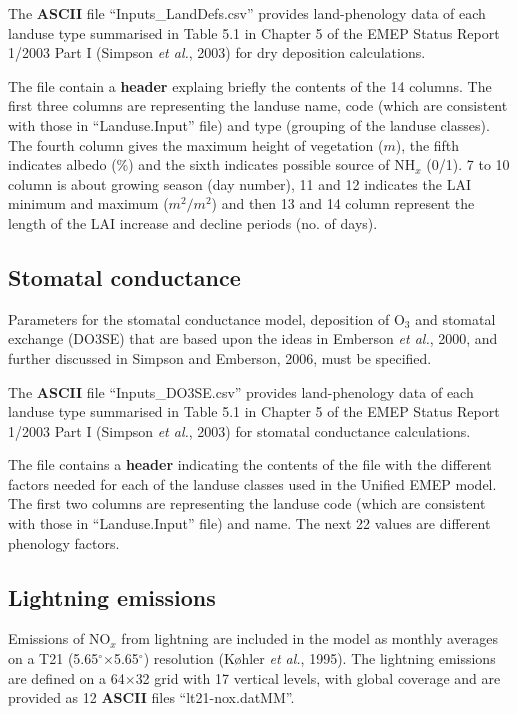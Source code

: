 The {\bf ASCII} file ``Inputs\_LandDefs.csv'' provides land-phenology data
of each landuse type summarised in Table 5.1 in Chapter 5 of the EMEP 
Status Report 1/2003 Part I (Simpson {\sl et al.}, 2003) for dry deposition 
calculations.

The file contain a {\bf header} explaing briefly the contents of the 
14 columns. 
The first three columns are representing the landuse name, code (which
are consistent with those in ``Landuse.Input'' file) and
type (grouping of the landuse classes). The fourth column gives
the maximum height of vegetation ($m$), the fifth indicates albedo (\%) and
the sixth indicates possible source of NH$_{x}$ (0/1). 7 to 10
column is about growing season (day number), 11 and 12 indicates the
LAI minimum  and maximum ($m^{2}/m^{2}$) and then 13 and 14 column
represent the length of the LAI increase and decline periods (no. of days).


\subsection{Stomatal conductance}
Parameters for the stomatal conductance model, deposition of O$_{3}$ and
stomatal exchange (DO3SE) that are based upon the ideas in
Emberson {\sl et al.}, 2000, and further discussed in Simpson and Emberson,
2006, must be specified.  

The {\bf ASCII} file ``Inputs\_DO3SE.csv'' provides land-phenology data
of each landuse type summarised in Table 5.1 in Chapter 5 of the EMEP 
Status Report 1/2003 Part I (Simpson {\sl et al.}, 2003) for stomatal
conductance calculations.

The file contains a {\bf header} indicating the contents of the file
with the different factors needed for each of the landuse classes used
in the Unified EMEP model. The first two columns are representing the
landuse code (which are consistent with those in ``Landuse.Input'' file)
and name. The next 22 values are different phenology factors.

\subsection{Lightning emissions}
Emissions of NO$_{x}$ from lightning are included in the model
as monthly averages on a T21 (5.65$^{\circ}$$\times$5.65$^{\circ}$) resolution (K{\o}hler {\sl et al.}, 1995). 
The lightning emissions are defined on a 64$\times$32 grid with 17 vertical
levels, with global coverage and are provided as 12 {\bf ASCII} files
``lt21-nox.datMM''.


